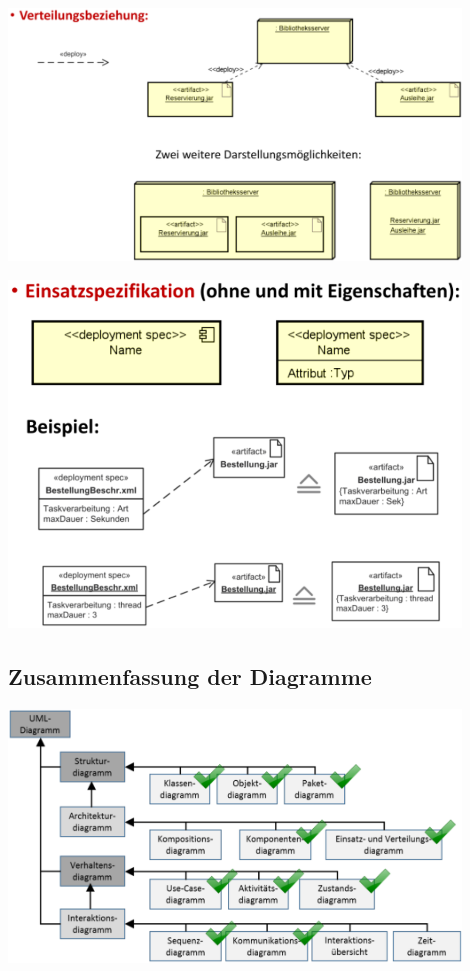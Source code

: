 \documentclass[11pt, a4paper]{article}
\begin{document}
\vspace{3em}

\begin{minipage}[h]{0.45\textwidth}
    \raggedright \includegraphics[width=0.9\textwidth]{Verteilung-03.png} 
\end{minipage}
\begin{minipage}[h]{0.45\textwidth}
    \raggedleft \includegraphics[width=0.9\textwidth]{Verteilung-04.png}   
\end{minipage}

\vspace{4em}



\subsection{Zusammenfassung der Diagramme}

\centering \includegraphics[width=0.9\textwidth]{UML-01.png}
\end{document}
